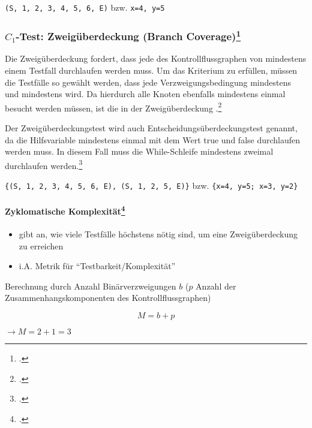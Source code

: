 \documentclass{lehramt-informatik}
\begin{document}
\texttt{(S, 1, 2, 3, 4, 5, 6, E)}
bzw.
\texttt{x=4, y=5}

%

\subsubsection{$C_1$-Test: Zweigüberdeckung (Branch Coverage)\footcite[Seite 37]{sosy:fs:5}}

Die Zweigüberdeckung fordert, dass jede  des
Kontrollflussgraphen von mindestens einem Testfall durchlaufen werden
muss. Um das Kriterium zu erfüllen, müssen die Testfälle so gewählt
werden, dass jede Verzweigungsbedingung mindestens 
und mindestens  wird. Da hierdurch alle Knoten
ebenfalls mindestens einmal besucht werden müssen, ist die
 in der Zweigüberdeckung .\footcite[Seite 209]{hoffmann}

Der Zweigüberdeckungstest wird auch Entscheidungsüberdeckungstest
genannt, da die Hilfsvariable mindestens einmal mit dem Wert true und
false durchlaufen werden muss. In diesem Fall muss die While-Schleife
mindestens zweimal durchlaufen werden.\footcite{wiki:kontrollfluss-test}


\texttt{\{(S, 1, 2, 3, 4, 5, 6, E), (S, 1, 2, 5, E)\}}
bzw.
\texttt{\{x=4, y=5; x=3, y=2\}}

%

\paragraph{Zyklomatische Komplexität\footcite[Seite 38]{sosy:fs:5}}

\begin{itemize}
\item gibt an, wie viele Testfälle höchstens nötig sind, um eine
Zweigüberdeckung zu erreichen

\item i.A. Metrik für “Testbarkeit/Komplexität”
\end{itemize}

\noindent
Berechnung durch Anzahl Binärverzweigungen $b$ ($p$ Anzahl der
Zusammenhangskomponenten des Kontrollflussgraphen)

\begin{displaymath}
M = b + p
\end{displaymath}

$\rightarrow M = 2 + 1 = 3$
\end{document}
